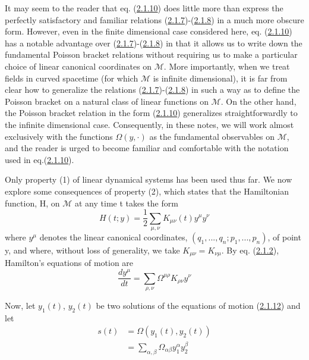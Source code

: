 \documentclass[11pt,a4paper]{article}
\begin{document}
It may seem to the reader that eq. (\hyperref[eq:2.1.10]{2.1.10}) does little more than express the perfectly satisfactory and familiar relations (\hyperref[eq:2.1.7]{2.1.7})-(\hyperref[eq:2.1.8]{2.1.8}) in a much more obscure form. However, even in the finite dimensional case considered here, eq. (\hyperref[eq:2.1.10]{2.1.10}) has a notable advantage over (\hyperref[eq:2.1.7]{2.1.7})-(\hyperref[eq:2.1.8]{2.1.8}) in that it allows us to write down the fundamental Poisson bracket relations without requiring us to make a particular choice of linear canonical coordinates on \(\mathcal{M}\). More importantly, when we treat fields in curved spacetime (for which \(\mathcal{M}\) is infinite dimensional), it is far from clear how to generalize the relations (\hyperref[eq:2.1.7]{2.1.7})-(\hyperref[eq:2.1.8]{2.1.8}) in such a way as to define the Poisson bracket on a natural class of linear functions on \(\mathcal{M}\). On the other hand, the Poisson bracket relation in the form (\hyperref[eq:2.1.10]{2.1.10}) generalizes straightforwardly to the infinite dimensional case. Consequently, in these notes, we will work almost exclusively with the functions \(\Omega(y,\cdot)\) as the fundamental observables on \(\mathcal{M}\), and the reader is urged to become\hypertarget{source-29}{} familiar and comfortable with the notation used in eq.(\hyperref[eq:2.1.10]{2.1.10}).

Only property (1) of linear dynamical systems has been used thus far. We now explore some consequences of property (2), which states that the Hamiltonian function, H, on \(\mathcal{M}\) at any time t takes the form
\begin{equation*}
H(t; y) = \frac{1}{2} \sum_{\mu,\nu} K_{\mu\nu}(t) y^{\mu} y^{\nu} \tag{2.1.11}\label{eq:2.1.11}
\end{equation*}
where \(y^{\mu}\) denotes the linear canonical coordinates, \((q_1,...,q_n; p_1,...,p_n)\), of point y, and where, without loss of generality, we take \(K_{\mu\nu}=K_{\nu\mu}\). By eq. (\hyperref[eq:2.1.2]{2.1.2}), Hamilton's equations of motion are
\begin{equation*}
\frac{dy^{\mu}}{dt} = \sum_{\rho,\nu} \Omega^{\mu\rho} K_{\rho\nu} y^{\nu} \tag{2.1.12}\label{eq:2.1.12}
\end{equation*}

Now, let \(y_1(t)\), \(y_2(t)\) be two solutions of the equations of motion (\hyperref[eq:2.1.12]{2.1.12}) and let
\begin{equation*}
\begin{aligned}s(t) &= \Omega(y_1(t), y_2(t))\\&= \sum_{\alpha, \beta} \Omega_{\alpha\beta} y_1^{\alpha} y_2^{\beta}\end{aligned} \tag{2.1.13}\label{eq:2.1.13}
\end{equation*}
\end{document}
